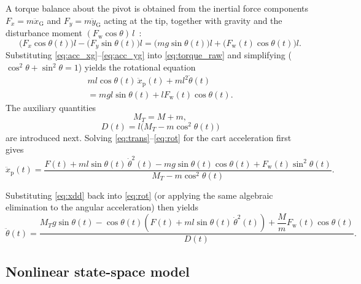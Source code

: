 \documentclass[twocolumn]{svjour3}
\begin{document}
A torque balance about the pivot is obtained from the inertial force components
$F_x=m\ddot{x}_\mathrm{G}$ and $F_y=m\ddot{y}_\mathrm{G}$ acting at the tip,
together with gravity and the disturbance moment $(F_\mathrm{w}\cos\theta)\,l$~\cite{Prasad2014}:
\begin{equation}
\bigl(F_x\cos\theta(t)\bigr)l - \bigl(F_y\sin\theta(t)\bigr)l
= \bigl(mg\sin\theta(t)\bigr)l + \bigl(F_\mathrm{w}(t)\cos\theta(t)\bigr)l.
\label{eq:torque_raw}
\end{equation}
Substituting \eqref{eq:acc_xg}--\eqref{eq:acc_yg} into \eqref{eq:torque_raw} and simplifying
($\cos^{2}\theta+\sin^{2}\theta=1$) yields the rotational equation
\begin{multline}
ml\cos\theta(t)\,\ddot{x}_\mathrm{p}(t) + ml^{2}\ddot{\theta}(t) \\
= mgl\sin\theta(t) + lF_\mathrm{w}(t)\cos\theta(t).
\label{eq:rot}
\end{multline}
The auxiliary quantities
\begin{equation}
M_T = M+m,
\label{eq:MT}
\end{equation}
\begin{equation}
D(t)=l\bigl(M_T - m\cos^{2}\!\theta(t)\bigr)
\label{eq:Dt}
\end{equation}
are introduced next. Solving \eqref{eq:trans}--\eqref{eq:rot} for the cart acceleration
first gives~\cite{Prasad2014}
\begin{equation}
\ddot{x}_\mathrm{p}(t) =
\frac{F(t) + ml\sin\theta(t)\,\dot{\theta}^{2}(t)
 - mg\sin\theta(t)\cos\theta(t)
 + F_\mathrm{w}(t)\sin^{2}\theta(t)}{M_T - m\cos^{2}\!\theta(t)}.
\label{eq:xdd}
\end{equation}

Substituting \eqref{eq:xdd} back into \eqref{eq:rot} (or applying the same algebraic elimination
to the angular acceleration) then yields
\begin{equation}
\ddot{\theta}(t) =
\frac{M_T g\sin\theta(t)
 - \cos\theta(t)\!\left(F(t) + ml\sin\theta(t)\,\dot{\theta}^{2}(t)\right)
 + \dfrac{M}{m}F_\mathrm{w}(t)\cos\theta(t)}{D(t)}.
\label{eq:tdd}
\end{equation}
\subsection{Nonlinear state-space model}
\end{document}
